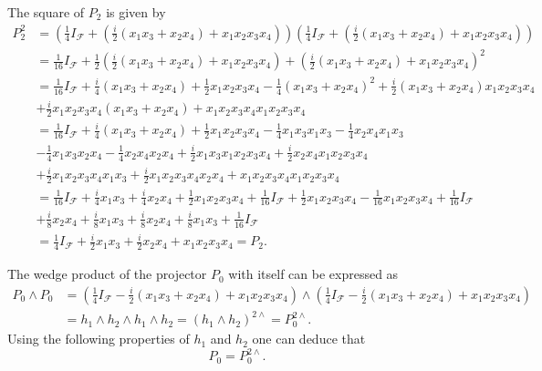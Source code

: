 \documentclass[aps,preprint]{revtex4}%
\begin{document}
The square of $P_{2}$ is given by
\begin{align}
P_{2}^{2}  &  =\left(  \frac{1}{4}I_{\mathcal{F}}+\left(  \frac{i}{2}\left(
x_{1}x_{3}+x_{2}x_{4}\right)  +x_{1}x_{2}x_{3}x_{4}\right)  \right)  \left(
\frac{1}{4}I_{\mathcal{F}}+\left(  \frac{i}{2}\left(  x_{1}x_{3}+x_{2}%
x_{4}\right)  +x_{1}x_{2}x_{3}x_{4}\right)  \right) \\
&  =\frac{1}{16}I_{\mathcal{F}}+\frac{1}{2}\left(  \frac{i}{2}\left(
x_{1}x_{3}+x_{2}x_{4}\right)  +x_{1}x_{2}x_{3}x_{4}\right)  +\left(  \frac
{i}{2}\left(  x_{1}x_{3}+x_{2}x_{4}\right)  +x_{1}x_{2}x_{3}x_{4}\right)
^{2}\\
&  =\frac{1}{16}I_{\mathcal{F}}+\frac{i}{4}\left(  x_{1}x_{3}+x_{2}%
x_{4}\right)  +\frac{1}{2}x_{1}x_{2}x_{3}x_{4}-\frac{1}{4}\left(  x_{1}%
x_{3}+x_{2}x_{4}\right)  ^{2}+\frac{i}{2}\left(  x_{1}x_{3}+x_{2}x_{4}\right)
x_{1}x_{2}x_{3}x_{4}\\
&  +\frac{i}{2}x_{1}x_{2}x_{3}x_{4}\left(  x_{1}x_{3}+x_{2}x_{4}\right)
+x_{1}x_{2}x_{3}x_{4}x_{1}x_{2}x_{3}x_{4}\\
&  =\frac{1}{16}I_{\mathcal{F}}+\frac{i}{4}\left(  x_{1}x_{3}+x_{2}%
x_{4}\right)  +\frac{1}{2}x_{1}x_{2}x_{3}x_{4}-\frac{1}{4}x_{1}x_{3}x_{1}%
x_{3}-\frac{1}{4}x_{2}x_{4}x_{1}x_{3}\\
&  -\frac{1}{4}x_{1}x_{3}x_{2}x_{4}-\frac{1}{4}x_{2}x_{4}x_{2}x_{4}+\frac
{i}{2}x_{1}x_{3}x_{1}x_{2}x_{3}x_{4}+\frac{i}{2}x_{2}x_{4}x_{1}x_{2}x_{3}%
x_{4}\\
&  +\frac{i}{2}x_{1}x_{2}x_{3}x_{4}x_{1}x_{3}+\frac{i}{2}x_{1}x_{2}x_{3}%
x_{4}x_{2}x_{4}+x_{1}x_{2}x_{3}x_{4}x_{1}x_{2}x_{3}x_{4}\\
&  =\frac{1}{16}I_{\mathcal{F}}+\frac{i}{4}x_{1}x_{3}+\frac{i}{4}x_{2}%
x_{4}+\frac{1}{2}x_{1}x_{2}x_{3}x_{4}+\frac{1}{16}I_{\mathcal{F}}+\frac{1}%
{2}x_{1}x_{2}x_{3}x_{4}-\frac{1}{16}x_{1}x_{2}x_{3}x_{4}+\frac{1}%
{16}I_{\mathcal{F}}\\
&  +\frac{i}{8}x_{2}x_{4}+\frac{i}{8}x_{1}x_{3}+\frac{i}{8}x_{2}x_{4}+\frac
{i}{8}x_{1}x_{3}+\frac{1}{16}I_{\mathcal{F}}\\
&  =\frac{1}{4}I_{\mathcal{F}}+\frac{i}{2}x_{1}x_{3}+\frac{i}{2}x_{2}%
x_{4}+x_{1}x_{2}x_{3}x_{4}=P_{2}.
\end{align}


The wedge product of the projector $P_{0}$ with itself can be expressed as
\begin{align}
P_{0}\wedge P_{0} &  =\left(  \frac{1}{4}I_{\mathcal{F}}-\frac{i}{2}\left(
x_{1}x_{3}+x_{2}x_{4}\right)  +x_{1}x_{2}x_{3}x_{4}\right)  \wedge\left(
\frac{1}{4}I_{\mathcal{F}}-\frac{i}{2}\left(  x_{1}x_{3}+x_{2}x_{4}\right)
+x_{1}x_{2}x_{3}x_{4}\right)  \\
&  =h_{1}\wedge h_{2}\wedge h_{1}\wedge h_{2}=\left(  h_{1}\wedge
h_{2}\right)  ^{2\wedge}=P_{0}^{2\wedge}.
\end{align}
Using the following properties of $h_{1}$ and $h_{2}$ one can deduce that
\begin{equation}
P_{0}=P_{0}^{2\wedge}.
\end{equation}
\end{document}
